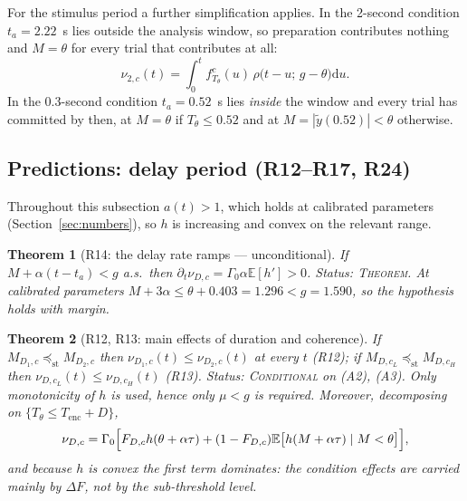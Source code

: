 \documentclass[11pt,a4paper]{article}
\newcommand{\E}{\mathbb{E}}
\newcommand{\dd}{\mathrm{d}}
\newcommand{\Mrv}{M}
\newcommand{\stle}{\preceq_{\mathrm{st}}}
\theoremstyle{plain}
\newtheorem{theorem}{Theorem}
\theoremstyle{remark}
\begin{document}
For the stimulus period a further simplification applies. In the 2-second condition
$t_a=2.22$~s lies outside the analysis window, so preparation contributes nothing and
$\Mrv=\theta$ for every trial that contributes at all:
\begin{equation}
\nu_{2,c}(t)=\int_0^{t}f^{c}_{T_\theta}(u)\,\rho\bigl(t-u;\,g-\theta\bigr)\dd u .
\label{eq:stim2s}
\end{equation}
In the 0.3-second condition $t_a=0.52$~s lies \emph{inside} the window and every trial has
committed by then, at $\Mrv=\theta$ if $T_\theta\le0.52$ and at $\Mrv=|\tilde y(0.52)|<\theta$
otherwise.

\subsection{Predictions: delay period (R12--R17, R24)}
\label{sec:delaypred}

Throughout this subsection $a(t)>1$, which holds at calibrated parameters
(Section~\ref{sec:numbers}), so $h$ is increasing and convex on the relevant range.

\begin{theorem}[R14: the delay rate ramps --- unconditional]
\label{thm:R14}
If $\Mrv+\alpha(t-t_a)<g$ a.s.\ then $\partial_t\nu_{D,c}=\Gamma_0\alpha\E[h']>0$.
\emph{Status: \textsc{Theorem}.} At calibrated parameters
$\Mrv+3\alpha\le\theta+0.403=1.296<g=1.590$, so the hypothesis holds with margin.
\end{theorem}

\begin{theorem}[R12, R13: main effects of duration and coherence]
\label{thm:R1213}
If $\Mrv_{D_1,c}\stle\Mrv_{D_2,c}$ then $\nu_{D_1,c}(t)\le\nu_{D_2,c}(t)$ at every $t$
(R12); if $\Mrv_{D,c_L}\stle\Mrv_{D,c_H}$ then $\nu_{D,c_L}(t)\le\nu_{D,c_H}(t)$ (R13).
\emph{Status: \textsc{Conditional} on (A2), (A3).}
Only monotonicity of $h$ is used, hence only $\mu<g$ is required.
Moreover, decomposing on $\{T_\theta\le T_{\text{enc}}+D\}$,
\begin{equation}
\nu_{D,c}=\Gamma_0\Bigl[F_{D,c}h(\theta+\alpha\tau)
+(1-F_{D,c})\E\bigl[h(\Mrv+\alpha\tau)\mid \Mrv<\theta\bigr]\Bigr],
\label{eq:mixture}
\end{equation}
and because $h$ is convex the first term dominates: the condition effects are carried
mainly by $\Delta F$, not by the sub-threshold level.
\end{theorem}
\end{document}
